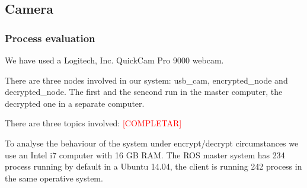 \documentclass[journal,twoside]{JoPhA}
\begin{document}
% 
% 



\subsection{Camera}


\subsubsection{Process evaluation}

We have used a Logitech, Inc. QuickCam Pro 9000 webcam.

There are three nodes involved in our system: usb\_cam, encrypted\_node and decrypted\_node. The first and the sencond run in the master computer, the decrypted one in a separate computer.

There are three topics involved: \textcolor{red}{[COMPLETAR]}

To analyse the behaviour of the system under encrypt/decrypt circumstances we use an Intel i7 computer with 16 GB RAM. The ROS master system has 234 process running by default in a Ubuntu 14.04, the client is running 242 process in the same operative system.
\end{document}
